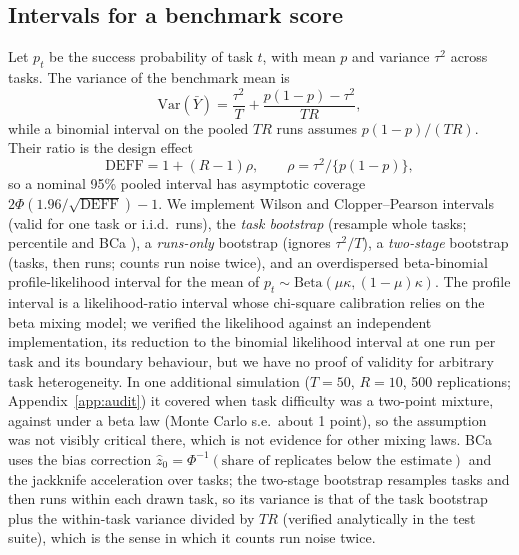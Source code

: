 \subsection{Intervals for a benchmark score}\label{sec:intervals}
Let $p_t$ be the success probability of task $t$, with mean $p$ and variance $\tau^2$ across tasks. The variance of the benchmark mean is
\begin{equation}
\mathrm{Var}(\bar Y)=\frac{\tau^2}{T}+\frac{p(1-p)-\tau^2}{TR},
\end{equation}
while a binomial interval on the pooled $TR$ runs assumes $p(1-p)/(TR)$. Their ratio is the design effect \citep{kish1965survey}
\begin{equation}
\mathrm{DEFF}=1+(R-1)\rho,\qquad \rho=\tau^2/\{p(1-p)\},
\end{equation}
so a nominal 95\% pooled interval has asymptotic coverage $2\Phi(1.96/\sqrt{\mathrm{DEFF}})-1$. We implement Wilson \citep{wilson1927} and Clopper--Pearson \citep{clopper1934} intervals (valid for one task or i.i.d.\ runs), the \emph{task bootstrap} (resample whole tasks; percentile and BCa \citep{efron1987bca,efron1993bootstrap}), a \emph{runs-only} bootstrap (ignores $\tau^2/T$), a \emph{two-stage} bootstrap (tasks, then runs; counts run noise twice), and an overdispersed beta-binomial profile-likelihood interval for the mean of $p_t\sim\mathrm{Beta}(\mu\kappa,(1-\mu)\kappa)$. The profile interval is a likelihood-ratio interval whose chi-square calibration relies on the beta mixing model; we verified the likelihood against an independent implementation, its reduction to the binomial likelihood interval at one run per task and its boundary behaviour, but we have no proof of validity for arbitrary task heterogeneity. In one additional simulation ($T=50$, $R=10$, 500 replications; Appendix~\ref{app:audit}) it covered \bbTwoPointCov{} when task difficulty was a two-point mixture, against \bbBetaCov{} under a beta law (Monte Carlo s.e.\ about 1 point), so the assumption was not visibly critical there, which is not evidence for other mixing laws. BCa uses the bias correction $\hat z_0=\Phi^{-1}(\text{share of replicates below the estimate})$ and the jackknife acceleration over tasks; the two-stage bootstrap resamples tasks and then runs within each drawn task, so its variance is that of the task bootstrap plus the within-task variance divided by $TR$ (verified analytically in the test suite), which is the sense in which it counts run noise twice.

